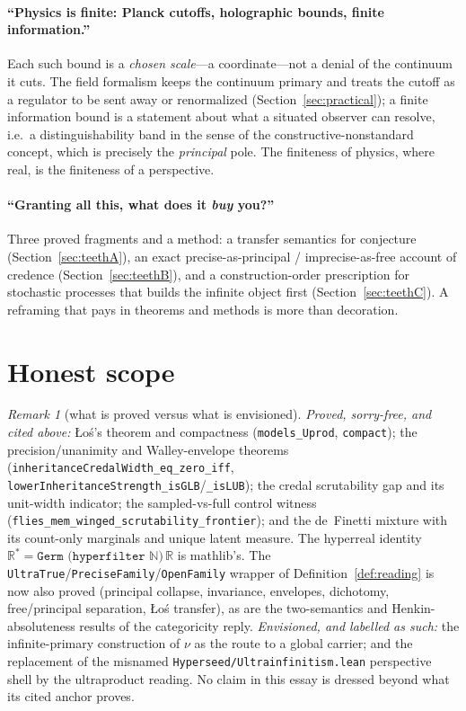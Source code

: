 \documentclass[]{article}
\theoremstyle{definition}
\theoremstyle{remark}
\newtheorem{remark}[theorem]{Remark}
\newcommand{\code}[1]{\texttt{#1}}
\newcommand{\lpath}[1]{{\ttfamily\nolinkurl{#1}}}
\newcommand{\R}{\mathbb{R}}
\newcommand{\N}{\mathbb{N}}
\begin{document}
\paragraph{``Physics is finite: Planck cutoffs, holographic bounds, finite
information.''} Each such bound is a \emph{chosen scale}---a coordinate---not a
denial of the continuum it cuts. The field formalism keeps the continuum primary and
treats the cutoff as a regulator to be sent away or renormalized
(Section~\ref{sec:practical}); a finite information bound is a statement about what a
situated observer can resolve, i.e.\ a distinguishability band in the sense of the
constructive-nonstandard concept, which is precisely the \emph{principal} pole. The
finiteness of physics, where real, is the finiteness of a perspective.

\paragraph{``Granting all this, what does it \emph{buy} you?''} Three proved
fragments and a method: a transfer semantics for conjecture
(Section~\ref{sec:teethA}), an exact precise-as-principal / imprecise-as-free
account of credence (Section~\ref{sec:teethB}), and a construction-order
prescription for stochastic processes that builds the infinite object first
(Section~\ref{sec:teethC}). A reframing that pays in theorems and methods is more
than decoration.

\section{Honest scope}
\label{sec:scope}

\begin{remark}[what is proved versus what is envisioned]
\emph{Proved, sorry-free, and cited above:} {\L}o\'s's theorem and compactness
(\code{models\_Uprod}, \code{compact}); the precision/unanimity and Walley-envelope
theorems (\code{inheritanceCredalWidth\_eq\_zero\_iff},
\code{lowerInheritanceStrength\_isGLB}/\code{\_isLUB}); the credal scrutability gap
and its unit-width indicator; the sampled-vs-full control witness
(\code{flies\_mem\_winged\_scrutability\_frontier}); and the de~Finetti mixture
with its count-only marginals and unique latent measure. The hyperreal identity
$\R^{\!*}=\code{Germ (hyperfilter }\N\code{)}\,\R$ is mathlib's. The
\code{UltraTrue}/\code{PreciseFamily}/\code{OpenFamily} wrapper of
Definition~\ref{def:reading} is now also proved (principal collapse, invariance,
envelopes, dichotomy, free/principal separation, {\L}o\'s transfer), as are the
two-semantics and Henkin-absoluteness results of the categoricity reply.
\emph{Envisioned, and labelled as such:} the
infinite-primary construction of $\nu$ as the route to a global carrier; and the
replacement of the misnamed \lpath{Hyperseed/Ultrainfinitism.lean} perspective
shell by the ultraproduct reading. No claim in this essay is dressed beyond what
its cited anchor proves.
\end{remark}
\end{document}
